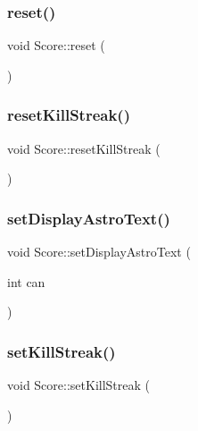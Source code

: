 \mbox{\label{class_score_a32804ba9a847e58160e6e0cef46e1f25}} 
\subsubsection{\texorpdfstring{reset()}{reset()}}
{\footnotesize\ttfamily void Score\+::reset (\begin{DoxyParamCaption}{ }\end{DoxyParamCaption})}

\mbox{\label{class_score_a152a46eb1f165db706409369d4da7959}} 
\subsubsection{\texorpdfstring{reset\+Kill\+Streak()}{resetKillStreak()}}
{\footnotesize\ttfamily void Score\+::reset\+Kill\+Streak (\begin{DoxyParamCaption}{ }\end{DoxyParamCaption})}

\mbox{\label{class_score_a3b9b2184527917932481449f410ab3ed}} 
\subsubsection{\texorpdfstring{set\+Display\+Astro\+Text()}{setDisplayAstroText()}}
{\footnotesize\ttfamily void Score\+::set\+Display\+Astro\+Text (\begin{DoxyParamCaption}\item[{int}]{can }\end{DoxyParamCaption})}

\mbox{\label{class_score_af0065ea2bf0bf3c1dc92140a1f7e371f}} 
\subsubsection{\texorpdfstring{set\+Kill\+Streak()}{setKillStreak()}}
{\footnotesize\ttfamily void Score\+::set\+Kill\+Streak (\begin{DoxyParamCaption}{ }\end{DoxyParamCaption})}

